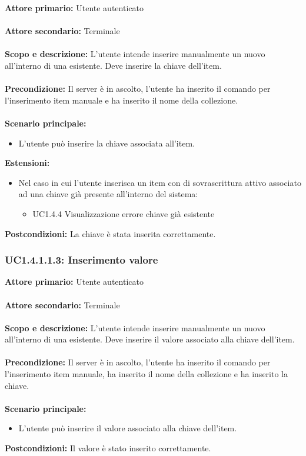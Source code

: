 \documentclass{scalatekids-article}
\begin{document}
\textbf{Attore primario:} Utente autenticato\\ \\
\textbf{Attore secondario:} Terminale\\ \\
\textbf{Scopo e descrizione:} L'utente intende inserire manualmente un nuovo  all'interno di una  esistente. Deve inserire la chiave dell'item.\\ \\
\textbf{Precondizione:} Il server è in ascolto, l'utente ha inserito il comando per l'inserimento item manuale e ha inserito il nome della collezione.\\ \\
\textbf{Scenario principale:}
\begin{itemize}
  \item L'utente può inserire la chiave associata all'item.
\end{itemize}
\textbf{Estensioni:}
\begin{itemize}
  \item Nel caso in cui l'utente inserisca un item con  di sovrascrittura attivo associato ad una chiave già presente all'interno del sistema:
  \begin{itemize}
    \item UC1.4.4 Visualizzazione errore chiave già esistente
  \end{itemize}
\end{itemize}
\textbf{Postcondizioni:} La chiave è stata inserita correttamente.

\subsubsection{UC1.4.1.1.3: Inserimento valore}

\textbf{Attore primario:} Utente autenticato\\ \\
\textbf{Attore secondario:} Terminale\\ \\
\textbf{Scopo e descrizione:} L'utente intende inserire manualmente un nuovo  all'interno di una  esistente. Deve inserire il valore associato alla chiave dell'item.\\ \\
\textbf{Precondizione:} Il server è in ascolto, l'utente ha inserito il comando per l'inserimento item manuale, ha inserito il nome della collezione e ha inserito la chiave.\\ \\
\textbf{Scenario principale:}
\begin{itemize}
  \item L'utente può inserire il valore associato alla chiave dell'item.
\end{itemize}
\textbf{Postcondizioni:} Il valore è stato inserito correttamente.
\end{document}
